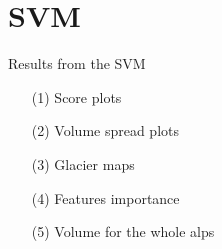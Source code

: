 \section{SVM}\label{svm}
Results from the SVM
\begin{itemize}
	\item[(1)] Score plots
	\item[(2)] Volume spread plots
	\item[(3)] Glacier maps
	\item[(4)] Features importance
	\item[(5)] Volume for the whole alps
\end{itemize}


%
%
%
%
%
%
%
